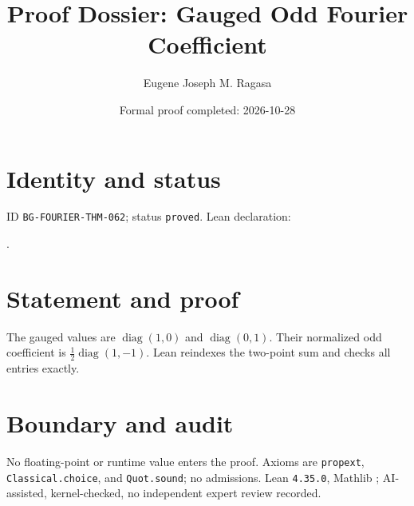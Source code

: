 \documentclass[11pt]{article}
\title{Proof Dossier: Gauged Odd Fourier Coefficient}\author{Eugene Joseph M. Ragasa}\date{Formal proof completed: 2026-10-28}
\begin{document}
\raggedright\maketitle
\section{Identity and status}
ID \texttt{BG-FOURIER-THM-062}; status \texttt{proved}. Lean declaration:
\par{}.
\section{Statement and proof}
The gauged values are $\operatorname{diag}(1,0)$ and $\operatorname{diag}(0,1)$. Their normalized odd coefficient is
$\tfrac12\operatorname{diag}(1,-1)$. Lean reindexes the two-point sum and checks all entries exactly.
\section{Boundary and audit}
No floating-point or runtime value enters the proof. Axioms are \texttt{propext}, \texttt{Classical.choice}, and \texttt{Quot.sound}; no admissions. Lean \texttt{4.35.0}, Mathlib {\scriptsize{}}; AI-assisted, kernel-checked, no independent expert review recorded.
\end{document}
